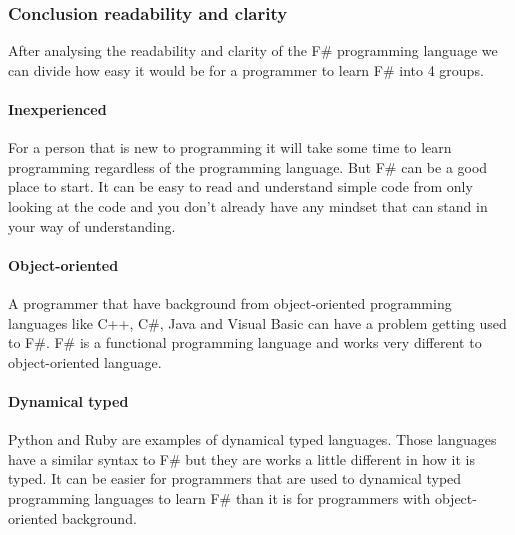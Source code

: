 \documentclass[12pt, a4paper]{article}
\newcommand*\quotefont{\fontfamily{LinuxLibertineT-LF}} %
\newcommand*\quotesize{60} %
\newcommand*{\openquote}
   {\tikz[remember picture,overlay,xshift=-4ex,yshift=-2.5ex]
   \node (OQ) {\quotefont\fontsize{\quotesize}{\quotesize}\selectfont``};\kern0pt}
\newcommand*{\closequote}[1]
  {\tikz[remember picture,overlay,xshift=4ex,yshift={#1}]
   \node (CQ) {\quotefont\fontsize{\quotesize}{\quotesize}\selectfont''};}
\newcommand*\shadedauthorformat{\emph} %
\newcommand*\authoralign[1]{
 	\def\authorfill{\hfill}\def\quotefill{}
}
\newenvironment{shadequote}[2][l]%
{\authoralign{#1}
\ifblank{#2}
   {\def\shadequoteauthor{}\def\yshift{-2ex}\def\quotefill{\hfill}}
   {\def\shadequoteauthor{\par\authorfill\shadedauthorformat{#2}}\def\yshift{2ex}}
\begin{snugshade}\begin{quote}\openquote}
{\shadequoteauthor\quotefill\closequote{\yshift}\end{quote}\end{snugshade}}
\begin{document}

\subsubsection{Conclusion readability and clarity}

After analysing the readability and clarity of the F\# programming language we can divide how easy it would be for a programmer to learn F\# into 4 groups.

\paragraph{Inexperienced}
For a person that is new to programming it will take some time to learn programming regardless of the programming language. But F\# can be a good place to start. It can be easy to read and understand simple code from only looking at the code and you don't already have any mindset that can stand in your way of understanding.

\paragraph{Object-oriented}
A programmer that have background from object-oriented programming languages like C++, C\#, Java and Visual Basic can have a problem getting used to F\#. F\# is a functional programming language and works very different to object-oriented language.


\paragraph{Dynamical typed}
Python and Ruby are examples of dynamical typed languages. Those languages have a similar syntax to F\# but they are works a little different in how it is typed. It can be easier for programmers that are used to dynamical typed programming languages to learn F\# than it is for programmers with object-oriented background.  
\end{document}
